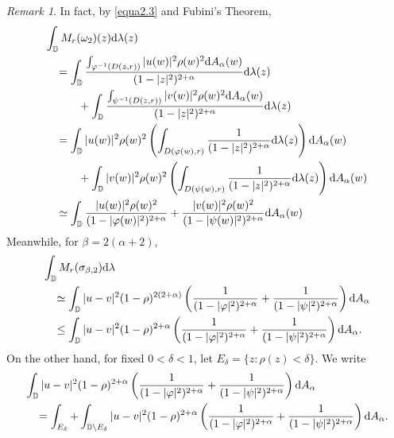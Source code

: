 \documentclass[preprint,12pt,times]{elsarticle}
\theoremstyle{definition}
\theoremstyle{remark}
\newtheorem{remark}[theorem]{Remark}
\numberwithin{equation}{section}
\begin{document}
\begin{remark}
In fact, by \eqref{equa2.3} and Fubini's Theorem, 
\begin{equation}\label{equa4.7}
\begin{split}
&\int_{\mathbb{D}}M_r(\omega_2)(z){\rm d}\lambda(z)\\
&\quad =\int_{\mathbb{D}}\frac{\int_{\varphi^{-1}(D(z,r))}|u(w)|^2\rho(w)^2{\rm d}A_{\alpha}(w)}{(1-|z|^2)^{2+\alpha}}{\rm d}\lambda(z)\\
&\qquad \quad +\int_{\mathbb{D}}\frac{\int_{\psi^{-1}(D(z,r))}|v(w)|^2\rho(w)^2{\rm d}A_{\alpha}(w)}{(1-|z|^2)^{2+\alpha}}{\rm d}\lambda(z)\\
&\quad =\int_{\mathbb{D}}|u(w)|^2\rho(w)^2\left(\int_{D(\varphi(w),r)}\frac{1}{(1-|z|^2)^{2+\alpha}}{\rm d}\lambda(z)\right){\rm d}A_{\alpha}(w)\\
&\qquad \quad +\int_{\mathbb{D}}|v(w)|^2\rho(w)^2\left(\int_{D(\psi(w),r)}\frac{1}{(1-|z|^2)^{2+\alpha}}{\rm d}\lambda(z)\right){\rm d}A_{\alpha}(w)\\
&\quad \simeq \int_{\mathbb{D}}\frac{|u(w)|^2\rho(w)^2}{(1-|\varphi(w)|^2)^{2+\alpha}}+\frac{|v(w)|^2\rho(w)^2}{(1-|\psi(w)|^2)^{2+\alpha}}{\rm d}A_{\alpha}(w)
\end{split}
\end{equation}
Meanwhile, for $\beta=2(\alpha+2)$,
\begin{equation}\label{equa4.8}
\begin{split}
&\int_{\mathbb{D}}M_r(\sigma_{\beta,2}){\rm d}\lambda\\
&\quad \simeq\int_{\mathbb{D}}|u-v|^2(1-\rho)^{2(2+\alpha)}\left(\frac{1}{(1-|\varphi|^2)^{2+\alpha}}+\frac{1}{(1-|\psi|^2)^{2+\alpha}}\right){\rm d}A_{\alpha}\\
&\quad \leq\int_{\mathbb{D}}|u-v|^2(1-\rho)^{2+\alpha}\left(\frac{1}{(1-|\varphi|^2)^{2+\alpha}}+\frac{1}{(1-|\psi|^2)^{2+\alpha}}\right){\rm d}A_{\alpha}.
\end{split}
\end{equation}
On the other hand, for fixed $0<\delta<1$, let $E_{\delta}=\{z:\rho(z)<\delta\}$. We write
\begin{equation*}
\begin{split}
&\int_{\mathbb{D}}|u-v|^2(1-\rho)^{2+\alpha}\left(\frac{1}{(1-|\varphi|^2)^{2+\alpha}}+\frac{1}{(1-|\psi|^2)^{2+\alpha}}\right){\rm d}A_{\alpha}\\
&\quad =\int_{E_{\delta}}+\int_{\mathbb{D}\backslash E_{\delta}}|u-v|^2(1-\rho)^{2+\alpha}\left(\frac{1}{(1-|\varphi|^2)^{2+\alpha}}+\frac{1}{(1-|\psi|^2)^{2+\alpha}}\right){\rm d}A_{\alpha}.
\end{split}

\end{equation*}
\end{remark}
\end{document}
